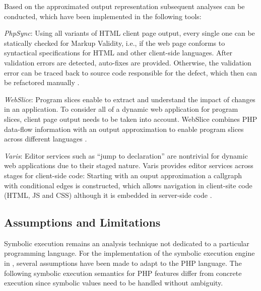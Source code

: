 \documentclass[preprint]{sig-alternate-05-2015}
\begin{document}
Based on the approximated output representation subsequent analyses can be conducted, which have been implemented in the following tools:

\begin{compactitem}
\item \emph{PhpSync}: Using all variants of  HTML client page output, every
single one can be statically checked for Markup Validity, i.e., if the web page
conforms to syntactical specifications for HTML and other client-side
languages. After validation errors are detected, auto-fixes are provided.
Otherwise, the validation error can be traced back to source code responsible
for the defect, which then can be refactored manually
\cite{Nguyen:2011:AFH:2190078.2190142}.

\item \emph{WebSlice}: Program slices enable to extract and understand the
impact of changes in an application. To consider all of a dynamic web
application for program slices, client page output needs to be taken into
account. WebSlice combines PHP data-flow information with an output
approximation to enable program slices across different languages
\cite{Nguyen:2015:CPS:2786805.2786872}.

\item \emph{Varis}: Editor services such as “jump to declaration” are
nontrivial for dynamic web applications due to their staged nature. Varis
provides editor services across stages for client-side code: Starting with an
ouput approximation a callgraph with conditional edges is constructed, which
allows navigation in client-site code (HTML, JS and CSS) although it is
embedded in server-side code
\cite{Nguyen:2015:VIS:2819009.2819140,Nguyen:2014:BCG:2635868.2635928}.
\end{compactitem}

\subsection{Assumptions and Limitations}
Symbolic execution remains an analysis technique not dedicated to a particular programming language. For the implementation of the symbolic execution engine in \cite{Nguyen:2014:BCG:2635868.2635928,Nguyen:2015:CPS:2786805.2786872}, several assumptions have been made to adapt to the PHP language. The following symbolic execution semantics for PHP features differ from concrete execution since symbolic values need to be handled without ambiguity. 
\end{document}
